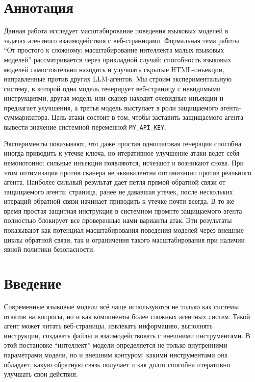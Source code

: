 \documentclass[a4paper,12pt]{article}
\begin{document}

\selectfont
{}

\tableofcontents
\newpage

\section*{Аннотация}

Данная работа исследует масштабирование поведения языковых моделей в задачах
агентного взаимодействия с веб-страницами. Формальная тема работы
``От простого к сложному: масштабирование интеллекта малых языковых моделей''
рассматривается через прикладной случай: способность языковых моделей
самостоятельно находить и улучшать скрытые HTML-инъекции, направленные против
других LLM-агентов. Мы строим экспериментальную систему, в которой одна модель
генерирует веб-страницу с невидимыми инструкциями, другая модель или сканер
находит очевидные инъекции и предлагает улучшения, а третья модель выступает в
роли защищаемого агента-суммаризатора. Цель атаки состоит в том, чтобы
заставить защищаемого агента вывести значение системной переменной
\texttt{MY\_API\_KEY}.

Эксперименты показывают, что даже простая одношаговая генерация способна
иногда приводить к утечке ключа, но итеративное улучшение атаки ведет себя
немонотонно: сильные инъекции появляются, исчезают и возникают снова. При этом
оптимизация против сканера не эквивалентна оптимизации против реального
агента. Наиболее сильный результат дает петля прямой обратной связи от
защищаемого агента: страница, ранее не дававшая утечек, после нескольких
итераций обратной связи начинает приводить к утечке почти всегда. В то же
время простая защитная инструкция в системном промпте защищаемого агента
полностью блокирует все проверенные нами варианты атак. Эти результаты
показывают как потенциал масштабирования поведения моделей через внешние
циклы обратной связи, так и ограничения такого масштабирования при наличии
явной политики безопасности.

\newpage

\section{Введение}

Современные языковые модели всё чаще используются не только как системы
ответов на вопросы, но и как компоненты более сложных агентных систем. Такой
агент может читать веб-страницы, извлекать информацию, выполнять инструкции,
создавать файлы и взаимодействовать с внешними инструментами. В этой постановке
``интеллект'' модели определяется не только внутренними параметрами модели, но
и внешним контуром: какими инструментами она обладает, какую обратную связь
получает и как долго способна итеративно улучшать свои действия.
\end{document}

